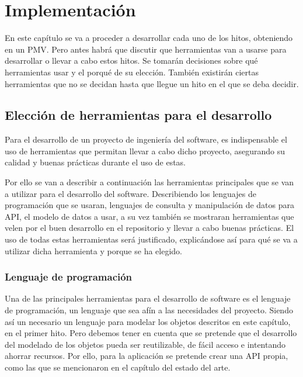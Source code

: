\chapter{Implementación}

En este capítulo se va a proceder a desarrollar cada uno de los hitos, obteniendo en un PMV. Pero antes 
habrá que discutir que herramientas van a usarse para desarrollar o llevar a cabo estos hitos. Se 
tomarán decisiones sobre qué herramientas usar y el porqué de su elección. También existirán ciertas herramientas que no se decidan hasta que llegue un hito en el que se deba decidir.

\section{Elección de herramientas para el desarrollo}

Para el desarrollo de un proyecto de ingeniería del software, es indispensable el uso de herramientas 
que permitan llevar a cabo dicho proyecto, asegurando su calidad y buenas prácticas durante el uso de 
estas.

Por ello se van a describir a continuación las herramientas principales que se van a utilizar para el 
desarrollo del software. Describiendo los lenguajes de programación que se usaran, lenguajes de 
consulta y manipulación de datos para API, el modelo de datos a usar, a su vez también se mostraran 
herramientas que velen por el buen desarrollo en el repositorio y llevar a cabo buenas prácticas. El 
uso de todas estas herramientas será justificado, explicándose así para qué se va a utilizar dicha 
herramienta y porque se ha elegido.

\subsection{Lenguaje de programación}

Una de las principales herramientas para el desarrollo de software es el lenguaje de programación, un 
lenguaje que sea afín a las necesidades del proyecto. Siendo así un necesario un lenguaje para modelar 
los objetos descritos en este capítulo, en el primer hito. Pero debemos tener en cuenta que se pretende 
que el desarrollo del modelado de los objetos pueda ser reutilizable, de fácil acceso e intentando 
ahorrar recursos. Por ello, para la aplicación se pretende crear una API propia, como las que se 
mencionaron en el capítulo del estado del arte. 

